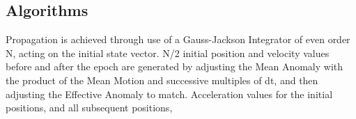 \documentclass[12pt,letterpaper]{paper}
\begin{document}

%
%
%
%
%
%
%
%
%
%
%
\subsection{Algorithms}
Propagation is achieved through use of a Gauss-Jackson Integrator of even order N, acting on the initial state vector. N/2 initial position and velocity values before and after the epoch are generated by adjusting the Mean Anomaly with the product of the Mean Motion and successive multiples of dt, and then adjusting the Effective Anomaly to match. Acceleration values for the initial positions, and all subsequent positions, 
\end{document}
